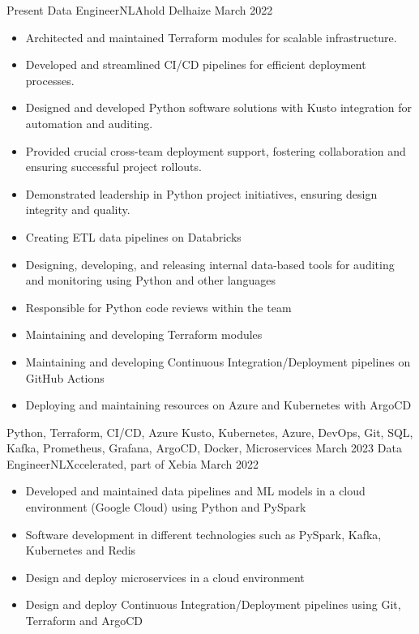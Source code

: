 \begin{experiences}
  \experience
  {Present}   {Data Engineer}{NL}{Ahold Delhaize}
  {March 2022} {
    \begin{itemize}
      \item Architected and maintained Terraform modules for scalable infrastructure.
      \item Developed and streamlined CI/CD pipelines for efficient deployment processes.
      \item Designed and developed Python software solutions with Kusto integration for automation and auditing.
      \item Provided crucial cross-team deployment support, fostering collaboration and ensuring successful project rollouts.
      \item Demonstrated leadership in Python project initiatives, ensuring design integrity and quality.
      \item Creating ETL data pipelines on Databricks
      \item Designing, developing, and releasing internal data-based tools for auditing and monitoring using Python and other languages
      \item Responsible for Python code reviews within the team
      \item Maintaining and developing Terraform modules
      \item Maintaining and developing Continuous Integration/Deployment pipelines on GitHub Actions
      \item Deploying and maintaining resources on Azure and Kubernetes with ArgoCD
    \end{itemize}
  }
  {Python, Terraform, CI/CD, Azure Kusto, Kubernetes, Azure, DevOps, Git, SQL, Kafka, Prometheus, Grafana, ArgoCD, Docker, Microservices}
  \emptySeparator
  \experience
  {March 2023}   {Data Engineer}{NL}{Xccelerated, part of Xebia}
  {March 2022} {
    \begin{itemize}
      \item Developed and maintained data pipelines and ML models in a cloud environment (Google Cloud) using Python and PySpark
      \item Software development in different technologies such as PySpark, Kafka, Kubernetes and Redis
      \item Design and deploy microservices in a cloud environment
      \item Design and deploy Continuous Integration/Deployment pipelines using Git, Terraform and ArgoCD

\end{itemize}}
\end{experiences}
